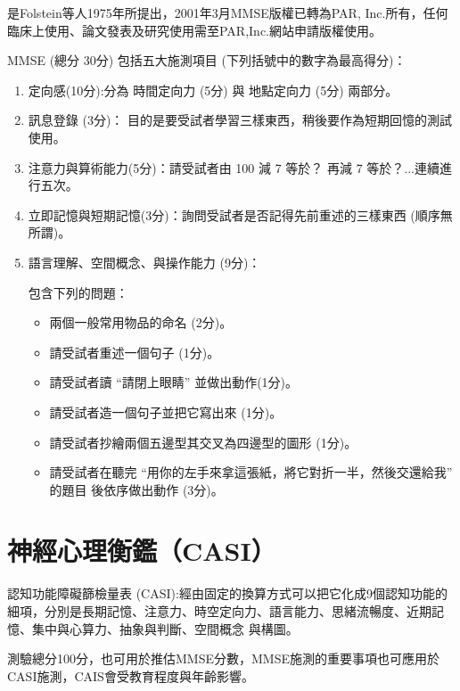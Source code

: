 是Folstein等人1975年所提出，2001年3月MMSE版權已轉為PAR, Inc.所有，任何臨床上使用、論文發表及研究使用需至PAR,Inc.網站申請版權使用。

MMSE (總分 30分) 包括五大施測項目 (下列括號中的數字為最高得分)：
\begin{enumerate}
	\item
    定向感(10分):分為 時間定向力 (5分) 與 地點定向力 (5分) 兩部分。
	\item
	訊息登錄 (3分)： 目的是要受試者學習三樣東西，稍後要作為短期回憶的測試使用。
	\item
	注意力與算術能力(5分)：請受試者由 100 減 7 等於？ 再減 7 等於？...連續進行五次。
	\item
    立即記憶與短期記憶(3分)：詢問受試者是否記得先前重述的三樣東西 (順序無所謂)。
	\item
	語言理解、空間概念、與操作能力 (9分)： 
	
	包含下列的問題：
	\begin{itemize}
		\item
		兩個一般常用物品的命名 (2分)。
		\item
		請受試者重述一個句子 (1分)。
		\item
		請受試者讀 “請閉上眼睛” 並做出動作(1分)。
		\item
		請受試者造一個句子並把它寫出來 (1分)。
		\item
		請受試者抄繪兩個五邊型其交叉為四邊型的圖形 (1分)。 
		\item
		請受試者在聽完 “用你的左手來拿這張紙，將它對折一半，然後交還給我” 的題目
後依序做出動作 (3分)。
	\end{itemize}

\end{enumerate}




\section{神經心理衡鑑（CASI）}
認知功能障礙篩檢量表 (CASI):經由固定的換算方式可以把它化成9個認知功能的細項，分別是長期記憶、注意力、時空定向力、語言能力、思緒流暢度、近期記憶、集中與心算力、抽象與判斷、空間概念
與構圖。

測驗總分100分，也可用於推估MMSE分數，MMSE施測的重要事項也可應用於CASI施測，CAIS會受教育程度與年齡影響。






%

%
